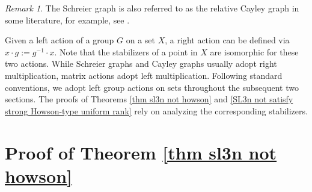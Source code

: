 \documentclass[]{amsart}
\newtheorem*{fixed point criterion}{\fixed point criterion}
\theoremstyle{definition}
\theoremstyle{remark}
\newtheorem{rem}[thm]{Remark}
\numberwithin{equation}{section}
\newcommand{\SL}{\operatorname{SL}}
\newcommand{\Z}{\mathbb Z}
\begin{document}
\begin{rem}
The Schreier graph is also referred to as the relative Cayley graph in some literature, for example, see \cite[Section 2]{ZZ262}. 
 
Given a left action of a group $G$ on a set $X$, a right action can be defined via $x\cdot g:=g^{-1}\cdot x$. Note that the stabilizers of a point in $X$ are isomorphic for these two actions. While Schreier graphs and Cayley graphs usually adopt right multiplication, matrix actions adopt left multiplication. Following standard conventions, we adopt left group actions on sets throughout the subsequent two sections. The proofs of Theorems \ref{thm sl3n not howson} and \ref{SL3n not satisfy strong Howson-type uniform rank} rely on analyzing the corresponding stabilizers.
\end{rem}

\section{Proof of Theorem \ref{thm sl3n not howson}}
\end{document}
